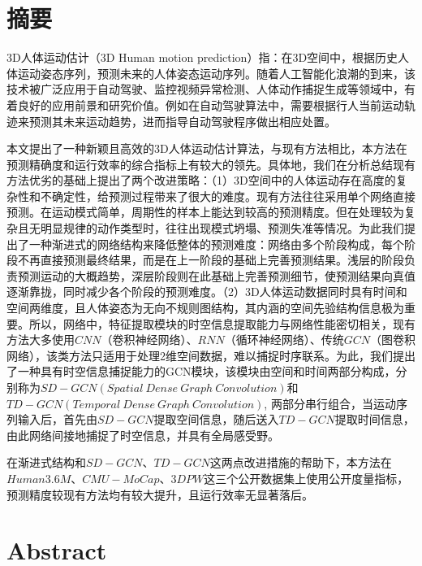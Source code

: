 \chapter{摘\texorpdfstring{\quad}{}要}
	3D人体运动估计（3D Human motion prediction）指：在3D空间中，根据历史人体运动姿态序列，预测未来的人体姿态运动序列。随着人工智能化浪潮的到来，该技术被广泛应用于自动驾驶、监控视频异常检测、人体动作捕捉生成等领域中，有着良好的应用前景和研究价值。例如在自动驾驶算法中，需要根据行人当前运动轨迹来预测其未来运动趋势，进而指导自动驾驶程序做出相应处置。
	
	本文提出了一种新颖且高效的3D人体运动估计算法，与现有方法相比，本方法在预测精确度和运行效率的综合指标上有较大的领先。具体地，我们在分析总结现有方法优劣的基础上提出了两个改进策略：（1）3D空间中的人体运动存在高度的复杂性和不确定性，给预测过程带来了很大的难度。现有方法往往采用单个网络直接预测。在运动模式简单，周期性的样本上能达到较高的预测精度。但在处理较为复杂且无明显规律的动作类型时，往往出现模式坍塌、预测失准等情况。为此我们提出了一种渐进式的网络结构来降低整体的预测难度：网络由多个阶段构成，每个阶段不再直接预测最终结果，而是在上一阶段的基础上完善预测结果。浅层的阶段负责预测运动的大概趋势，深层阶段则在此基础上完善预测细节，使预测结果向真值逐渐靠拢，同时减少各个阶段的预测难度。（2）3D人体运动数据同时具有时间和空间两维度，且人体姿态为无向不规则图结构，其内涵的空间先验结构信息极为重要。所以，网络中，特征提取模块的时空信息提取能力与网络性能密切相关，现有方法大多使用$CNN$（卷积神经网络）、$RNN$（循环神经网络）、传统$GCN$（图卷积网络），该类方法只适用于处理2维空间数据，难以捕捉时序联系。为此，我们提出了一种具有时空信息捕捉能力的GCN模块，该模块由空间和时间两部分构成，分别称为$SD-GCN(Spatial \ Dense \ Graph \ Convolution)$和$TD-GCN(Temporal \ Dense \ Graph \ Convolution)$, 两部分串行组合，当运动序列输入后，首先由$SD-GCN$提取空间信息，随后送入$TD-GCN$提取时间信息，由此网络间接地捕捉了时空信息，并具有全局感受野。
	
	在渐进式结构和$SD-GCN$、$TD-GCN$这两点改进措施的帮助下，本方法在$Human3.6M$、$CMU-MoCap$、$3DPW$这三个公开数据集上使用公开度量指标，预测精度较现有方法均有较大提升，且运行效率无显著落后。



\chapter{Abstract}
	

